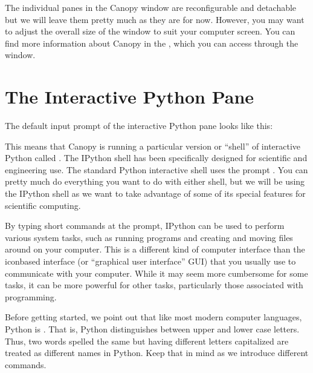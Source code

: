 \documentclass[letterpaper,10pt,english]{sphinxmanual}
\begin{document}
\sphinxAtStartPar
The individual panes in the Canopy window are reconfigurable and detachable but we will leave them pretty much as they are for now.  However, you may want to adjust the overall size of the window to suit your computer screen.  You can find more information about Canopy in the , which you can access through the  window.

\ignorespaces 

\section{The Interactive Python Pane}
\label{\detokenize{chap2/chap2_basics:the-interactive-python-pane}}\label{\detokenize{chap2/chap2_basics:index-2}}
\sphinxAtStartPar
The default input prompt of the interactive Python pane looks like this:

\begin{sphinxVerbatim}[commandchars=\\\{\}]
\end{sphinxVerbatim}

\ignorespaces 
\sphinxAtStartPar
This means that Canopy is running a particular version or “shell” of interactive Python called . The IPython shell has been specifically designed for scientific and engineering use.  The standard Python interactive shell uses the prompt \sphinxcode{\sphinxupquote{\textgreater{}\textgreater{}\textgreater{}}}.  You can pretty much do everything you want to do with either shell, but we will be using the IPython shell as we want to take advantage of some of its special features for scientific computing.

\sphinxAtStartPar
By typing short commands at the prompt, IPython can be used to perform various system tasks, such as running programs and creating and moving files around on your computer.  This is a different kind of computer interface than the icon\sphinxhyphen{}based interface (or “graphical user interface” GUI) that you usually use to communicate with your computer.  While it may seem more cumbersome for some tasks, it can be more powerful for other tasks, particularly those associated with programming.

\sphinxAtStartPar
Before getting started, we point out that like most modern computer languages, Python is .  That is, Python distinguishes between upper and lower case letters.  Thus, two words spelled the same but having different letters capitalized are treated as different names in Python.  Keep that in mind as we introduce different commands.
\end{document}
